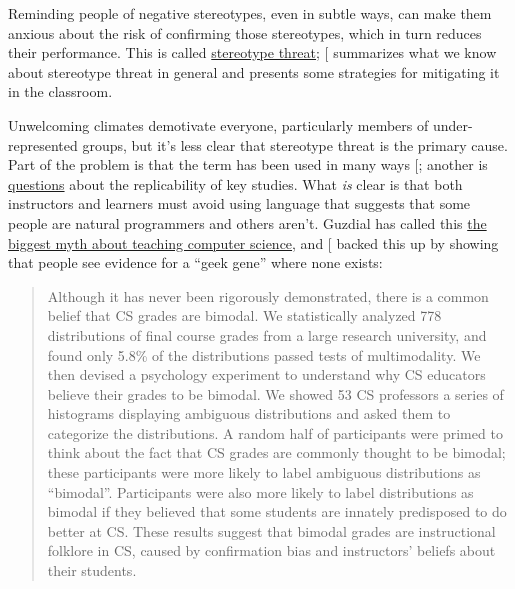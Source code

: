 Reminding people of negative stereotypes, even in subtle ways, can make
them anxious about the risk of confirming those stereotypes, which in
turn reduces their performance. This is called
\protect\hyperlink{g:stereotype-threat}{stereotype threat}; {[}\protect[\hyperlink{b:Stee2011}{Stee2011}]{]}
summarizes what we know about stereotype threat in general and presents
some strategies for mitigating it in the classroom.

Unwelcoming climates demotivate everyone, particularly members of
under-represented groups, but it's less clear that stereotype threat
is the primary cause. Part of the problem is that the term has been
used in many ways {[}\protect[\hyperlink{b:Shap2007}{Shap2007}]{]}; another is
\href{https://www.psychologytoday.com/blog/rabble-rouser/201512/is-stereotype-threat-overcooked-overstated-and-oversold}{questions} about the replicability of
key studies. What \emph{is} clear is that both instructors and learners
must avoid using language that suggests that some people are natural
programmers and others aren't. Guzdial has called this \href{https://cacm.acm.org/blogs/blog-cacm/189498-top-10-myths-about-teaching-computer-science/fulltext}{the biggest
myth about teaching computer science}, and
{[}\protect[\hyperlink{b:Pati2016}{Pati2016}]{]} backed this up by showing that people see evidence
for a ``geek gene'' where none exists:

\begin{quote}\setlength{\parindent}{0pt}
Although it has never been rigorously demonstrated, there is a common
belief that CS grades are bimodal. We statistically analyzed 778
distributions of final course grades from a large research university,
and found only 5.8\% of the distributions passed tests of
multimodality. We then devised a psychology experiment to understand
why CS educators believe their grades to be bimodal. We showed 53 CS
professors a series of histograms displaying ambiguous distributions
and asked them to categorize the distributions. A random half of
participants were primed to think about the fact that CS grades are
commonly thought to be bimodal; these participants were more likely to
label ambiguous distributions as ``bimodal''. Participants were also
more likely to label distributions as bimodal if they believed that
some students are innately predisposed to do better at CS. These
results suggest that bimodal grades are instructional folklore in CS,
caused by confirmation bias and instructors' beliefs about their
students.
\end{quote}

